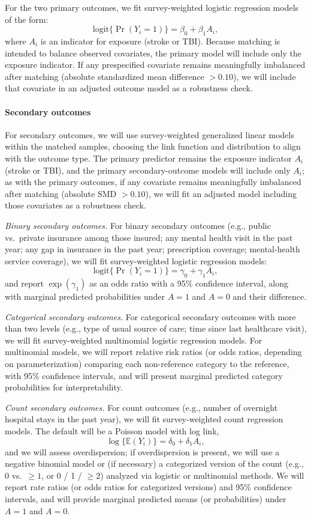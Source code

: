 \documentclass{article}
\begin{document}
For the two primary outcomes, we fit survey-weighted logistic regression models of the form:
\[
\text{logit}\{\Pr(Y_i = 1)\} = \beta_0 + \beta_1 A_i,
\]
where $A_i$ is an indicator for exposure (stroke or TBI). Because matching is intended to balance observed covariates, the primary model will include only the exposure indicator. If any prespecified covariate remains meaningfully imbalanced after matching (absolute standardized mean difference $>0.10$), we will include that covariate in an adjusted outcome model as a robustness check.

\paragraph{Secondary outcomes}

For secondary outcomes, we will use survey-weighted generalized linear models within the matched samples, choosing the link function and distribution to align with the outcome type. The primary predictor remains the exposure indicator $A_i$ (stroke or TBI), and the primary secondary-outcome models will include only $A_i$; as with the primary outcomes, if any covariate remains meaningfully imbalanced after matching (absolute SMD $>0.10$), we will fit an adjusted model including those covariates as a robustness check.

\textit{Binary secondary outcomes.} For binary secondary outcomes (e.g., public vs.\ private insurance among those insured; any mental health visit in the past year; any gap in insurance in the past year; prescription coverage; mental-health service coverage), we will fit survey-weighted logistic regression models:
\[
\text{logit}\{\Pr(Y_i = 1)\} = \gamma_0 + \gamma_1 A_i,
\]
and report $\exp(\gamma_1)$ as an odds ratio with a 95\% confidence interval, along with marginal predicted probabilities under $A=1$ and $A=0$ and their difference.

\textit{Categorical secondary outcomes.} For categorical secondary outcomes with more than two levels (e.g., type of usual source of care; time since last healthcare visit), we will fit survey-weighted multinomial logistic regression models. For multinomial models, we will report relative risk ratios (or odds ratios, depending on parameterization) comparing each non-reference category to the reference, with 95\% confidence intervals, and will present marginal predicted category probabilities for interpretability.

\textit{Count secondary outcomes.} For count outcomes (e.g., number of overnight hospital stays in the past year), we will fit survey-weighted count regression models. The default will be a Poisson model with log link,
\[
\log\{\mathbb{E}(Y_i)\} = \delta_0 + \delta_1 A_i,
\]
and we will assess overdispersion; if overdispersion is present, we will use a negative binomial model or (if necessary) a categorized version of the count (e.g., 0 vs.\ $\ge 1$, or 0 / 1 / $\ge 2$) analyzed via logistic or multinomial methods. We will report rate ratios (or odds ratios for categorized versions) and 95\% confidence intervals, and will provide marginal predicted means (or probabilities) under $A=1$ and $A=0$.
\end{document}
